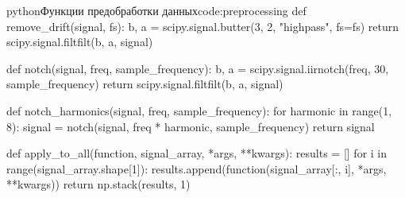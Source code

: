 \begin{mintedbox}[]{python}{Функции предобработки данных}{code:preprocessing}
    def remove_drift(signal, fs):
        b, a = scipy.signal.butter(3, 2, "highpass", fs=fs)
        return scipy.signal.filtfilt(b, a, signal)

    def notch(signal, freq, sample_frequency):
        b, a = scipy.signal.iirnotch(freq, 30, sample_frequency)
        return scipy.signal.filtfilt(b, a, signal)

    def notch_harmonics(signal, freq, sample_frequency):
        for harmonic in range(1, 8):
            signal = notch(signal, freq * harmonic, sample_frequency)
        return signal 

    def apply_to_all(function, signal_array, *args, **kwargs):
        results = []
        for i in range(signal_array.shape[1]):
            results.append(function(signal_array[:, i], *args, **kwargs))
        return np.stack(results, 1)
\end{mintedbox}
